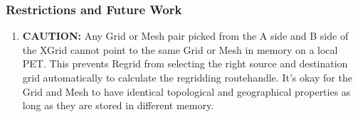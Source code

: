 
\subsubsection{Restrictions and Future Work}

\begin{enumerate}
\label{XGrid:rest}

\item {\bf CAUTION:} Any Grid or Mesh pair picked from the A side and B side of the XGrid 
cannot point to the same Grid or Mesh in memory on a local PET. This prevents Regrid from
selecting the right source and destination grid automatically to calculate the regridding routehandle.
It's okay for the Grid and Mesh to have identical topological and geographical properties as long
as they are stored in different memory.

\end{enumerate}



